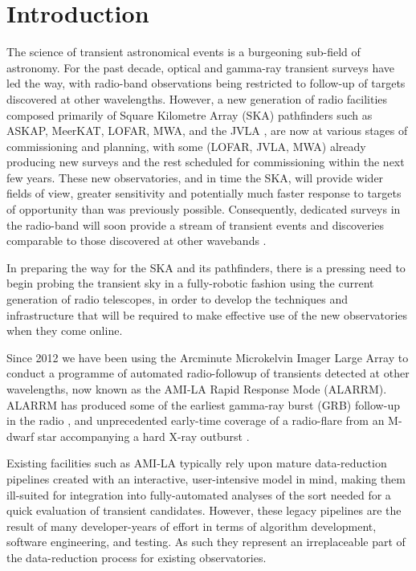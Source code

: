 \documentclass[5p,authoryear]{elsarticle}
\begin{document}
\section{Introduction}
\label{sec:intro}
The science of transient astronomical events is a burgeoning sub-field of astronomy. 
For the past decade, optical and gamma-ray transient surveys have led the way, with radio-band observations being restricted to follow-up of targets discovered at other wavelengths.
However, a new generation of radio facilities composed primarily of Square Kilometre Array (SKA) pathfinders such as ASKAP, MeerKAT, LOFAR, MWA, and the JVLA \citep{Norris2013}, are now at various stages of commissioning and planning, with some (LOFAR, JVLA, MWA) already producing new surveys and the rest scheduled for commissioning within the next few years.
These new observatories, and in time the SKA, will provide wider fields of view, 
greater sensitivity and potentially much faster response to targets of opportunity than was previously possible. 
Consequently, dedicated surveys in the radio-band will soon provide a stream of transient events and discoveries comparable to those discovered at other wavebands \citep{Burlon2015,Corbel2015,Macquart2015,Stappers2013}.

In preparing the way for the SKA and its pathfinders, there is a pressing
need to begin probing the transient sky in a fully-robotic fashion 
using the current generation of radio telescopes, in order to develop the 
techniques and infrastructure that will be required to make effective use of the
new observatories when they come online.  

Since 2012 we have been using the Arcminute Microkelvin Imager Large Array \citep[AMI-LA,][]{Zwart2008} to conduct a programme of automated radio-followup of transients detected at other wavelengths, now known as the AMI-LA Rapid Response Mode (ALARRM).
ALARRM has produced some of the earliest 
gamma-ray burst (GRB) follow-up in the radio \citep{Staley2013,Anderson2014},
and unprecedented early-time coverage of a radio-flare from an M-dwarf
star accompanying a hard X-ray outburst \citep{Fender2015}.

Existing facilities such as AMI-LA typically rely upon mature data-reduction pipelines created with an interactive, user-intensive model in mind, making them ill-suited for integration into fully-automated analyses of the sort needed for a quick evaluation of transient candidates. 
However, these legacy pipelines are the result of many developer-years of effort in terms of algorithm development, software engineering, and testing.
As such they represent an irreplaceable part of the data-reduction process for existing observatories. 
\end{document}
